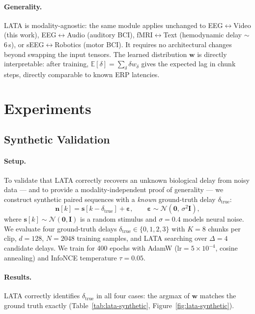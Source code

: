 \documentclass[11pt]{article}
\begin{document}
\paragraph{Generality.}
LATA is modality-agnostic: the same module applies unchanged to
EEG$\leftrightarrow$Video (this work),
EEG$\leftrightarrow$Audio (auditory BCI),
fMRI$\leftrightarrow$Text (hemodynamic delay $\sim$6\,s), or
sEEG$\leftrightarrow$Robotics (motor BCI).
It requires no architectural changes beyond swapping the input tensors.
The learned distribution $\mathbf{w}$ is directly interpretable: after
training, $\mathbb{E}[\delta] = \sum_\delta \delta w_\delta$ gives the
expected lag in chunk steps, directly comparable to known ERP latencies.

\section{Experiments}

\subsection{Synthetic Validation}
\label{sec:lata-synthetic}

\paragraph{Setup.}
To validate that LATA correctly recovers an unknown biological delay from
noisy data — and to provide a modality-independent proof of generality —
we construct synthetic paired sequences with a \emph{known} ground-truth
delay $\delta_\mathrm{true}$:
%
\begin{equation}
    \mathbf{n}[k] = \mathbf{s}[k - \delta_\mathrm{true}] + \boldsymbol{\varepsilon},
    \qquad \boldsymbol{\varepsilon} \sim \mathcal{N}(\mathbf{0},\,\sigma^2\mathbf{I}),
\end{equation}
%
where $\mathbf{s}[k] \sim \mathcal{N}(\mathbf{0}, \mathbf{I})$ is a random
stimulus and $\sigma = 0.4$ models neural noise.
We evaluate four ground-truth delays $\delta_\mathrm{true} \in \{0,1,2,3\}$
with $K{=}8$ chunks per clip, $d{=}128$, $N{=}2048$ training samples, and
LATA searching over $\Delta{=}4$ candidate delays.
We train for 400 epochs with AdamW ($\mathrm{lr}=5\times10^{-4}$, cosine
annealing) and InfoNCE temperature $\tau=0.05$.

\paragraph{Results.}
LATA correctly identifies $\delta_\mathrm{true}$ in all four cases:
the argmax of $\mathbf{w}$ matches the ground truth exactly
(Table~\ref{tab:lata-synthetic}, Figure~\ref{fig:lata-synthetic}).
\end{document}
